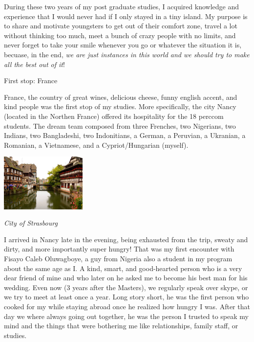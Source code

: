 \documentclass[10pt,a4paper]{article} %
\newcommand{\NewsItem}[1]{ %
\usefont{T1}{fvs}{n}{n} %
\vspace{24pt}\large #1\vspace{3pt} %
\par \normalsize \normalfont}
\begin{document}
\begin{multicols}{3}
During these two years of my post graduate studies, I acquired knowledge and 
experience that I would never had if I only stayed in a tiny island. 
My purpose is to share and motivate youngsters to get out of their comfort zone, 
travel a lot without thinking too much, meet a bunch of crazy people with no limits, 
and never forget to take your smile whenever you go or whatever the situation it is, 
becuase, in the end, \textit{we are just instances in this world and we 
should try to make all the best out of it}!


\NewsItem{First stop: France}
France, the country of great wines, delicious cheese, funny english accent, 
and kind people was the first stop of my studies. 
More specifically, the city Nancy (located in the Northen France) offered its hospitality 
for the 18 {\sc perccom} students. 
The dream team composed from three Frenches, two Nigerians, two Indians, two Bangladeshi, two 
Indonitians, a German, a Peruvian, a Ukranian, a Romanian, a Vietnamese, and a 
Cypriot/Hungarian (myself).  


\begin{center}
	\includegraphics[width=0.32\textwidth]{media/strasbourg.jpg}
	\par\textit{City of Strasbourg}
\end{center} 

I arrived in Nancy late in the evening, being exhausted from the trip, sweaty and 
dirty, and more importantly super hungry! 
That was my first encounter with Fisayo Caleb Oluwagboye, a guy from Nigeria also 
a student in my program about the same age as I. 
A kind, smart, and good-hearted person who is a very dear friend of mine 
and who later on he asked me to become his best man for his wedding.    
Even now (3 years after the Masters), we regularly speak over skype, or we try to 
meet at least once a year. 
Long story short, he was the first person who cooked for my while staying abroad 
once he realized how hungry I was. 
After that day we where always going out together, he was the person I trusted to 
speak my mind and the things that were bothering me like relationships, family staff, 
or studies. 



\end{multicols}
\end{document}
